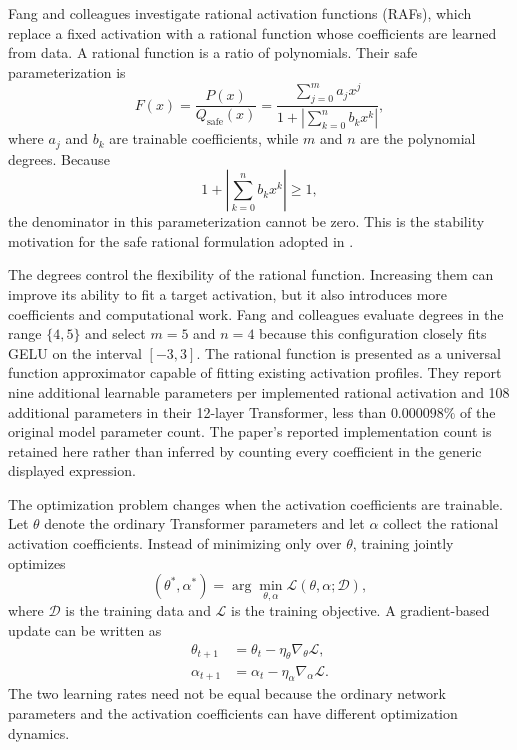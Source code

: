 Fang and colleagues investigate rational activation functions (RAFs),
which replace a fixed activation with a rational function whose
coefficients are learned from data. A rational function is a ratio of
polynomials. Their safe parameterization is
\begin{equation}
    F(x)
    =
    \frac{P(x)}{Q_{\mathrm{safe}}(x)}
    =
    \frac{
        \displaystyle\sum_{j=0}^{m}a_jx^j
    }{
        1+
        \left|
            \displaystyle\sum_{k=0}^{n}b_kx^k
        \right|
    },
    \label{eq:act-raf}
\end{equation}
where \(a_j\) and \(b_k\) are trainable coefficients, while \(m\) and
\(n\) are the polynomial degrees. Because
\begin{equation}
    1+
    \left|\sum_{k=0}^{n}b_kx^k\right|
    \geq 1,
    \label{eq:act-raf-denominator-bound}
\end{equation}
the denominator in this parameterization cannot be zero. This is the
stability motivation for the safe rational formulation adopted in
\textcite{fang2023raft}.

The degrees control the flexibility of the rational function. Increasing
them can improve its ability to fit a target activation, but it also
introduces more coefficients and computational work. Fang and colleagues
evaluate degrees in the range \(\{4,5\}\) and select \(m=5\) and \(n=4\)
because this configuration closely fits GELU on the interval
\([-3,3]\). The rational function is presented as a universal function approximator
capable of fitting existing activation profiles. They report nine
additional learnable parameters per implemented rational activation and
108 additional parameters in their 12-layer Transformer, less than \(0.000098\%\) of the original model
parameter count. The paper's reported implementation count is retained
here rather than inferred by counting every coefficient in the generic
displayed expression.

The optimization problem changes when the activation coefficients are
trainable. Let \(\theta\) denote the ordinary Transformer parameters and
let \(\alpha\) collect the rational activation coefficients. Instead of
minimizing only over \(\theta\), training jointly optimizes
\begin{equation}
    (\theta^*,\alpha^*)
    =
    \arg\min_{\theta,\alpha}
    \mathcal{L}(\theta,\alpha;\mathcal{D}),
    \label{eq:act-raf-joint-objective}
\end{equation}
where \(\mathcal{D}\) is the training data and \(\mathcal{L}\) is the
training objective. A gradient-based update can be written as
\begin{align}
    \theta_{t+1}
    &=
    \theta_t-\eta_{\theta}\nabla_{\theta}\mathcal{L},
    \label{eq:act-raf-theta-update}\\
    \alpha_{t+1}
    &=
    \alpha_t-\eta_{\alpha}\nabla_{\alpha}\mathcal{L}.
    \label{eq:act-raf-alpha-update}
\end{align}
The two learning rates need not be equal because the ordinary network
parameters and the activation coefficients can have different
optimization dynamics.

